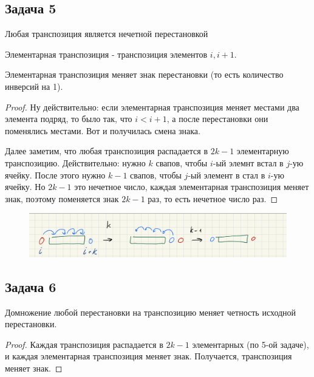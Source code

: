 \subsection{Задача 5}

Любая транспозиция является нечетной перестановкой

\begin{definition}
\label{claim::ElementaryTransposition}
Элементарная транспозиция - транспозиция элементов $i, i+1$.
\end{definition}

\begin{claim*}
Элементарная транспозиция меняет знак перестановки (то есть количество инверсий на 1).
\end{claim*}

\begin{proof}
Ну действительно: если элементарная транспозиция меняет местами два элемента подряд, то было так, что $i < i+1$, а после перестановки они поменялись местами. Вот и получилась смена знака.

Далее заметим, что любая транспозиция  распадается в $2k - 1$ элементарную транспозицию. Действительно: нужно $k$ свапов, чтобы $i$-ый элемнт встал в $j$-ую ячейку. После этого нужно $k - 1$ свапов, чтобы $j$-ый элемент в стал в $i$-ую ячейку. Но $2k - 1$ это нечетное число, каждая элементарная транспозиция меняет знак, поэтому поменяется знак $2k - 1$ раз, то есть нечетное число раз.
\end{proof}

\begin{figure}[h]
    \centering
    \includegraphics[width=1\linewidth]{Figures/sem5_task7.png}
\end{figure}

\subsection{Задача 6}
Домножение любой перестановки на транспозицию меняет четность исходной перестановки.
\begin{proof}
Каждая транспозиция распадается в $2k - 1$ элементарных (по 5-ой задаче), и каждая элементарная транспозиция меняет знак. Получается, транспозиция меняет знак.
\end{proof}


